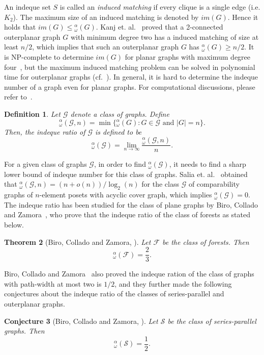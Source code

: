 \documentclass{article}
\newtheorem{thm}{Theorem}[section]
\newtheorem{conj}[thm]{Conjecture}
\newtheorem{defn}[thm]{Definition}
\newcommand{\idq}{{}^{\alpha}_{\omega}}
\begin{document}
 An indeque set $S$ is called an {\em induced matching} if every clique is a single edge (i.e. $K_2$). The maximum size of an induced matching is denoted by $im(G)$. Hence it holds that $im(G)\le \idq(G)$.  Kanj et. al.~\cite{KPSX} proved that a 2-connected outerplanar graph $G$ with minimum degree two has a induced matching of size at least $n/2$, which implies that such an outerplanar graph $G$ has $\idq(G)\ge n/2$. It is NP-complete to determine $im(G)$ for planar graphs with maximum degree four~\cite{KS}, but the maximum induced matching problem can be solved in polynomial time for outerplanar graphs  (cf.~\cite{KK}). In general, it is hard to determine the indeque number of a graph even for planar graphs. For computational discussions, please refer to~\cite{ELWB}. 
 

\begin{defn}
    Let $\mathcal G$ denote a class of graphs. Define $$\idq(\mathcal G, n) = \min\{\idq(G) : G \in \mathcal G \mbox { and } |G| = n\}.$$
    Then, the \textit{indeque ratio} of $\mathcal G$ is defined to be $$\idq(\mathcal G) = \lim_{n \to \infty}\frac{\idq(\mathcal G, n)}{n}.$$
\end{defn}

For a given class of graphs $\mathcal G$, in order to find $\idq(\mathcal G)$, it needs to find a sharp lower bound of indeque number for this class of graphs. Salia et. al.~\cite{SSTZ} obtained that $\idq(\mathcal G, n)=(n+o(n))/\log_2(n)$ for the class $\mathcal G$ of comparability graphs of $n$-element posets with acyclic cover graph, which implies $\idq(\mathcal G)=0$. The indeque ratio has been studied for the class of plane graphs by Biro, Collado and Zamora~\cite{BCZ}, who prove that the indeque ratio of the class of forests as stated below.

\begin{thm}[Biro, Collado and Zamora, \cite{BCZ}]\label{thm:forest}
    Let $\mathcal F$ be the class of forests. Then 
    \[\idq(\mathcal F)=\frac 2 3.\]
\end{thm}

Biro, Collado and Zamora~\cite{BCZ} also proved the indeque ration of the class of graphs with path-width at most two is $1/2$, and they further made the following conjectures about the indeque ratio of the classes of series-parallel and outerplanar graphs. 

\begin{conj}[Biro, Collado and Zamora, \cite{BCZ}]\label{conj1}
    Let $\mathcal S$ be the class of series-parallel graphs. Then 
    \[\idq(\mathcal S)=\frac 1 2.\]
\end{conj}
\end{document}

